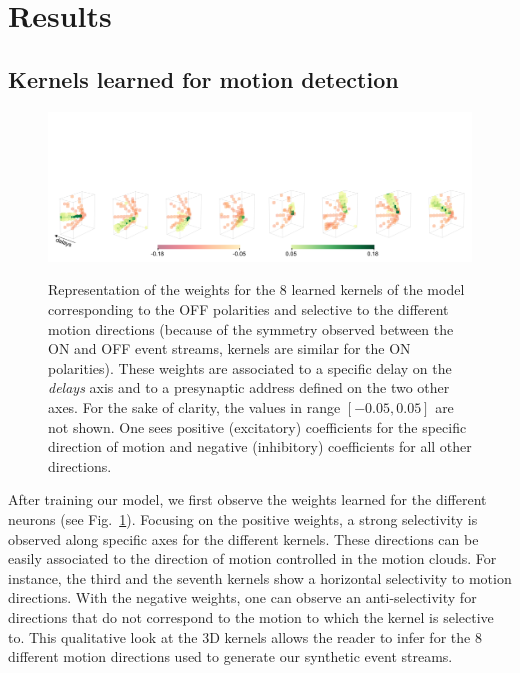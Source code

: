 \documentclass[default]{sn-jnl}%
\theoremstyle{thmstyleone}%
\theoremstyle{thmstyletwo}%
\theoremstyle{thmstylethree}%
\newcommand{\seeFig}[1]{see Fig.~\ref{fig:#1}}%
\begin{document}
\section{Results}
\label{sec:results}
\subsection{Kernels learned for motion detection}
\begin{figure}[ht!]
    {\centering
    \vspace{-3cm}
    \includegraphics[width=\linewidth]{figures/3D_kernels_oneline.png}
    }
    \caption{
    	Representation of the weights for the $8$ learned kernels of the model corresponding to the OFF polarities and selective to the different motion directions
	(because of the symmetry observed between the ON and OFF event streams, kernels are similar for the ON polarities). These weights are associated to a specific delay on the \textit{delays} axis and to a presynaptic address defined on the two other axes.
	For the sake of clarity, the values in range $[-0.05, 0.05]$ are not shown. One sees positive (excitatory) coefficients for the specific direction of motion and negative (inhibitory) coefficients for all other directions.
	}
    \label{fig:kernels}
\end{figure} 
%
%
After training our model, we first observe the weights learned for the different neurons (\seeFig{kernels}). Focusing on the positive weights, a strong selectivity is observed along specific axes for the different kernels. These directions can be easily associated to the direction of motion controlled in the motion clouds. For instance, the third and the seventh kernels show a horizontal selectivity to motion directions.
%
With the negative weights, one can observe an anti-selectivity for directions that do not correspond to the motion to which the kernel is selective to. This qualitative look at the 3D kernels allows the reader to infer for the $8$ different motion directions used to generate our synthetic event streams.
\end{document}
